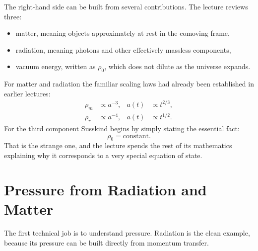 The right-hand side can be built from several contributions. The lecture reviews three:
\begin{itemize}
\item matter, meaning objects approximately at rest in the comoving frame,
\item radiation, meaning photons and other effectively massless components,
\item vacuum energy, written as \(\rho_0\), which does not dilute as the universe expands.
\end{itemize}

For matter and radiation the familiar scaling laws had already been established in earlier lectures:
\begin{align}
\rho_m &\propto a^{-3},
&
a(t) &\propto t^{2/3},
\\
\rho_r &\propto a^{-4},
&
a(t) &\propto t^{1/2}.
\end{align}
For the third component Susskind begins by simply stating the essential fact:
\begin{equation}
\rho_0 = \text{constant}.
\end{equation}
That is the strange one, and the lecture spends the rest of its mathematics explaining why it corresponds to a very special equation of state.

\section{Pressure from Radiation and Matter}

The first technical job is to understand pressure. Radiation is the clean example, because its pressure can be built directly from momentum transfer.

